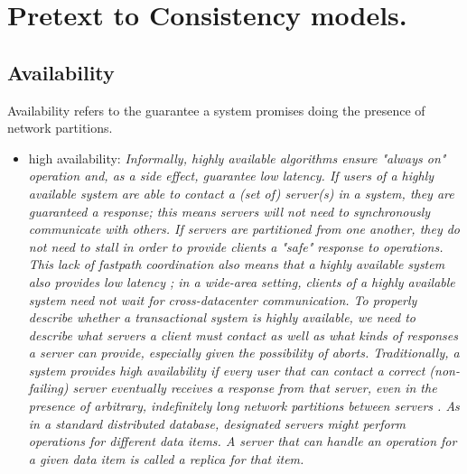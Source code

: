 \documentclass[a4paper,10pt,titlepage]{report}
\begin{document}
    \newpage


    \section{Pretext to Consistency models.}

    \subsection{Availability}

    Availability refers to the guarantee a system promises doing the presence of network partitions.\cite{HighlyAvailableTransactionsVirtuesandLimitations}

    \begin{itemize}
        \item high availability:
        \textit{
            Informally, highly available algorithms ensure "always on" operation and, as a side effect, guarantee low latency. If users of a highly available system are able to contact a (set of) server(s) in a system, they are guaranteed a response; this means servers will not need to synchronously communicate with others. If servers are partitioned from one another, they do not need to stall in order to provide clients a "safe" response to operations. This lack of fastpath coordination also means that a highly available system also provides low latency ; in a wide-area setting, clients of a highly available system need not wait for cross-datacenter communication. To properly describe whether a transactional system is highly available, we need to describe what servers a client must contact as well as what kinds of responses a server can provide, especially given the possibility of aborts. Traditionally, a system provides high availability if every user that can contact a correct (non-failing) server eventually receives a response from that server, even in the presence of arbitrary, indefinitely long network partitions between servers \cite{CAP}. As in a standard distributed database, designated servers might perform operations for different data items. A server that can handle an operation for a given data item is called a replica for that item.}\cite{HighlyAvailableTransactionsVirtuesandLimitations}

\end{itemize}
\end{document}
